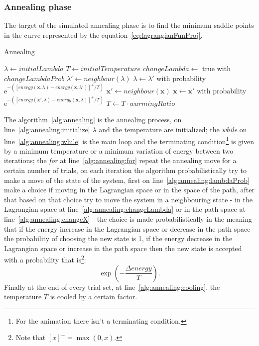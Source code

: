 \documentclass[a4paper]{article}
\newcommand{\me}{\ensuremath{\mathrm{e}}}
\begin{document}
\subsubsection{Annealing phase}
The target of the simulated annealing phase is to find the minimum
saddle points in
the curve represented by the
equation~\eqref{eq:lagrangianFunProj}.
\begin{algorithm}
 \caption{Annealing}\label{alg:annealing}
 \begin{algorithmic}[1]
   \State $\lambda\gets initialLambda$\label{alg:annealing:initialize}
   \State $T\gets initialTemperature$
   \label{alg:annealing:while}
   \label{alg:annealing:for}
   \State $changeLambda\gets$ true with $changeLambdaProb$\label{alg:annealing:lambdaProb}
   \State $\lambda'\gets neighbour(\lambda)$\label{alg:annealing:changeLambda}
   \State $\lambda\gets \lambda'$ with probability $\me^{-([energy(\mathbf{x},\lambda)-energy(\mathbf{x},\lambda')]^+/T)}$
   \Else
   \State $\mathbf{x}'\gets neighbour(\mathbf{x})$\label{alg:annealing:changeX}
   \State $\mathbf{x}\gets \mathbf{x}'$ with probability $\me^{-([energy(\mathbf{x}',\lambda)-energy(\mathbf{x},\lambda)]^+/T)}$
   \EndIf
   \EndFor
   \State $T\gets T\cdot warmingRatio$\label{alg:annealing:cooling}
   \EndWhile
   \EndProcedure
 \end{algorithmic}
\end{algorithm}

The algorithm~\ref{alg:annealing} is the annealing process, on
line~\ref{alg:annealing:initialize} $\lambda$ and the
temperature are initialized; the \emph{while} on
line~\ref{alg:annealing:while} is the main loop and the terminating
condition\footnote{For the animation there isn't a terminating
  condition.} is given by a minimum temperature or a minimum variation of
energy between two iterations; the \emph{for} at
line~\ref{alg:annealing:for} repeat the annealing move for a certain
number of trials, on each iteration the algorithm probabilistically
try to make a move of the state of the system, first on
line~\ref{alg:annealing:lambdaProb} make a choice if moving in the
Lagrangian space or in the space of the path, after that based on that
choice try to move the system in a neighbouring state - in the
Lagrangian space at
line~\ref{alg:annealing:changeLambda} or in the path space at
line~\ref{alg:annealing:changeX} - the choice is made
probabilistically in the meaning that if the energy increase in the
Lagrangian space or decrease in the path space the probability of
choosing the new state is 1, if the energy decrease in the Lagrangian
space or increase in the path space then the new state is accepted
with a probability that is\footnote{Note that $[x]^+=\max(0,x)$.}:
$$\exp(-\frac{\Delta energy}{T}).$$
Finally at the end of every trial set,
at line~\ref{alg:annealing:cooling}, the temperature $T$ is cooled by
a certain factor.
\end{document}
